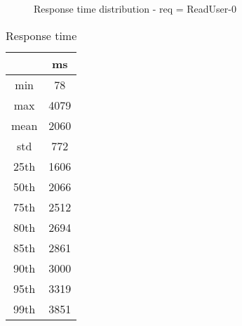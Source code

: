 \begin{minipage}{0.75\linewidth}
\begin{figure}[h]
\begin{adjustbox}{max width=1.0\linewidth, keepaspectratio}
  \end{adjustbox}
  \caption{Response time distribution - req = ReadUser-0}
\end{figure}
\end{minipage}\hfill\begin{minipage}{0.18\linewidth}
\begin{table}[h]
\begin{tabular}{|cc|}
\hline
\textbf{} & \textbf{ms}\\ \hline
 \Xhline{0.005\arrayrulewidth}
min & 78\\
 \Xhline{0.005\arrayrulewidth}
max & 4079\\
 \Xhline{0.005\arrayrulewidth}
mean & 2060\\
 \Xhline{0.005\arrayrulewidth}
std & 772\\
\hline
\hline
 \Xhline{0.005\arrayrulewidth}
25th & 1606\\
 \Xhline{0.005\arrayrulewidth}
50th & 2066\\
 \Xhline{0.005\arrayrulewidth}
75th & 2512\\
 \Xhline{0.005\arrayrulewidth}
80th & 2694\\
 \Xhline{0.005\arrayrulewidth}
85th & 2861\\
 \Xhline{0.005\arrayrulewidth}
90th & 3000\\
 \Xhline{0.005\arrayrulewidth}
95th & 3319\\
 \Xhline{0.005\arrayrulewidth}
99th & 3851\\
\hline
\end{tabular}
\caption{Response time}
\end{table}
\end{minipage}\hfill